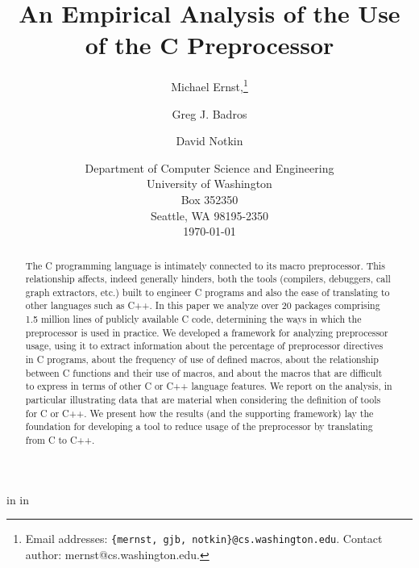 
\marginparwidth 0pt
\oddsidemargin  0pt
\evensidemargin 0pt
\marginparsep 0pt

\topmargin   0pt

 in
 in




\title{An Empirical Analysis of the Use of the C Preprocessor}

\author{Michael Ernst,\thanks{Email 
addresses: {\tt \{mernst, gjb, notkin\}@cs.washington.edu}.  Contact author:
mernst@cs.washington.edu.}
\and Greg J. Badros \and David Notkin}


\date{Department of Computer
Science and Engineering\\
University of Washington\\
Box 352350\\
Seattle, WA  98195-2350\\
\today}  

\maketitle


\begin{abstract}

  The C programming language is intimately connected to its macro
  preprocessor.  This relationship affects, indeed generally hinders,
  both the tools (compilers, debuggers, call graph extractors, etc.)
  built to engineer C programs and also the ease of translating to other
  languages such as C++.  In this paper we analyze over 20 packages
  comprising 1.5 million lines of publicly available C code, determining
  the ways in which the preprocessor is used in practice.  We developed
  a framework for analyzing preprocessor usage, using it to extract
  information about the percentage of preprocessor directives in C
  programs, about the frequency of use of defined macros, about the
  relationship between C functions and their use of macros, and about
  the macros that are difficult to express in terms of other C or C++
  language features.  We report on the analysis, in particular
  illustrating data that are material when considering the definition of
  tools for C or C++.  We present how the results (and the supporting
  framework) lay the foundation for developing a tool to reduce usage of
  the preprocessor by translating from C to C++.

\end{abstract}

